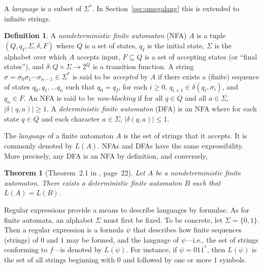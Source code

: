 \documentclass{amsart}
\theoremstyle{plain}
\newtheorem{thm}{Theorem}
\theoremstyle{definition}
\newtheorem{defn}{Definition}
\theoremstyle{definition}
\begin{document}
A \textit{language} is a subset of $\Sigma^{*}$.  In Section~\ref{sec:omegalang}
this is extended to infinite strings.

\begin{defn}\label{def:nfa}
A \textit{nondeterministic finite automaton} (NFA) $A$ is a tuple $( Q, q_I,
\Sigma, \delta, F )$ where $Q$ is a set of states, $q_I$ is the initial state,
$\Sigma$ is the alphabet over which $A$ accepts input, $F\subseteq Q$ is a set
of accepting states (or ``final states''), and $\delta: Q\times\Sigma
\rightarrow 2^Q$ is a transition function.  A string $\sigma=\sigma_0 \sigma_1
\cdots \sigma_{n-1} \in\Sigma^{*}$ is said to be \textit{accepted} by $A$ if
there exists a (finite) sequence of states $q_0 , q_1 , \ldots q_n$ such that
$q_0 = q_I$, for each $i\geq 0$, $q_{i+1}\in \delta(q_i , \sigma_{i})$, and $q_n
\in F$.  An NFA is said to be \textit{non-blocking} if for all $q\in Q$ and all
$a\in \Sigma$, $\lvert\delta(q,a)\rvert\geq 1$.  A \textit{deterministic finite
  automaton} (DFA) is an NFA where for each state $q\in Q$ and each character
$a\in \Sigma$, $\lvert\delta(q,a)\rvert\leq 1$.
\end{defn}
The \textit{language} of a finite automaton $A$ is the set of strings that it
accepts.  It is commonly denoted by $L(A)$.  NFAs and DFAs have the same
expressibility.  More precisely, any DFA is an NFA by definition, and
conversely,
\begin{thm}[Theorem~2.1 in \cite{Hopcroft1979}, page~22]
Let $A$ be a nondeterministic finite automaton.  There exists a deterministic
finite automaton $B$ such that $L(A)=L(B)$.
\end{thm}

Regular expressions provide a means to describe languages by formulae.  As for
finite automata, an alphabet $\Sigma$ must first be fixed.  To be concrete, let
$\Sigma=\{0,1\}$.  Then a regular expression is a formula $\psi$ that describes
how finite sequences (strings) of $0$ and $1$ may be formed, and the language of
$\psi$---i.e., the set of strings conforming to $f$---is denoted by $L(\psi)$.
For instance, if $\psi=011^{*}$, then $L(\psi)$ is the set of all strings
beginning with $0$ and followed by one or more $1$ symbols.
\end{document}
